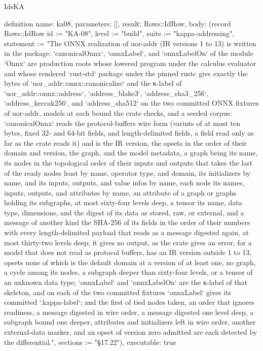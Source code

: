 \begin{lexlean}{IdsKA}
\begin{semanticmodule}
definition{
  name: ka08,
  parameters: [],
  result: Rows::IdRow,
  body: (record Rows::IdRow {id := "KA-08", level := "build", suite := "kappa-addressing", statement := "The ONNX realization of uor-addr (IR versions 1 to 13) is written in the package: `canonicalOnnx`, `onnxLabel`, and `onnxLabelOn` of the module `Onnx` are production roots whose lowered program under the calculus evaluator and whose rendered `rust-std` package under the pinned rustc give exactly the bytes of `uor_addr::onnx::canonicalize` and the κ-label of `uor_addr::onnx::address`, `address_blake3`, `address_sha3_256`, `address_keccak256`, and `address_sha512` on the two committed ONNX fixtures of uor-addr, models at each bound the crate checks, and a seeded corpus: `canonicalOnnx` reads the protocol-buffers wire form (varints of at most ten bytes, fixed 32- and 64-bit fields, and length-delimited fields, a field read only as far as the crate reads it) and is the IR version, the opsets in the order of their domain and version, the graph, and the model metadata, a graph being its name, its nodes in the topological order of their inputs and outputs that takes the last of the ready nodes least by name, operator type, and domain, its initializers by name, and its inputs, outputs, and value infos by name, each node its names, inputs, outputs, and attributes by name, an attribute of a graph or graphs holding its subgraphs, at most sixty-four levels deep, a tensor its name, data type, dimensions, and the digest of its data as stored, raw, or external, and a message of another kind the SHA-256 of its fields in the order of their numbers with every length-delimited payload that reads as a message digested again, at most thirty-two levels deep; it gives no output, as the crate gives an error, for a model that does not read as protocol buffers, has an IR version outside 1 to 13, opsets none of which is the default domain at a version of at least one, no graph, a cycle among its nodes, a subgraph deeper than sixty-four levels, or a tensor of an unknown data type; `onnxLabel` and `onnxLabelOn` are the κ-label of that skeleton, and on each of the two committed fixtures `onnxLabel` gives its committed `.kappa-label`; and the first of tied nodes taken, an order that ignores readiness, a message digested in wire order, a message digested one level deep, a subgraph bound one deeper, attributes and initializers left in wire order, another external-data marker, and an opset of version zero admitted are each detected by the differential.", sections := "§17.22"}),
  executable: true
}
\end{semanticmodule}
\end{lexlean}
